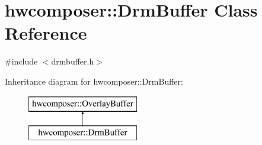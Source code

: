 \hypertarget{classhwcomposer_1_1DrmBuffer}{}\section{hwcomposer\+:\+:Drm\+Buffer Class Reference}
\label{classhwcomposer_1_1DrmBuffer}


{\ttfamily \#include $<$drmbuffer.\+h$>$}

Inheritance diagram for hwcomposer\+:\+:Drm\+Buffer\+:\begin{figure}[H]
\begin{center}
\leavevmode
\includegraphics[height=2.000000cm]{classhwcomposer_1_1DrmBuffer}
\end{center}
\end{figure}
